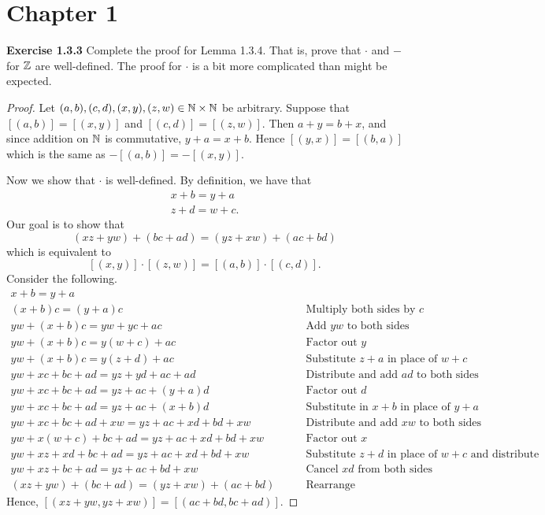 \newpage
\section*{Chapter 1}

\noindent \textbf{Exercise 1.3.3} Complete the proof for Lemma 1.3.4. That is, prove that \(\cdot\) and \(-\) for \(\mathbb{Z}\) are well-defined. The proof for \(\cdot\) is a bit more complicated
than might be expected.
\begin{proof}
    Let \((a,b), (c,d), (x,y), (z,w) \in \mathbb{N} \times \mathbb{N}\) be arbitrary. Suppose that \([(a,b)] = [(x,y)]\) and \([(c,d)] = [(z,w)]\). Then \(a + y = b+x\), and since addition on \(\mathbb{N}\) is commutative, \(y+a = x+b\).
    Hence \([(y,x)] = [(b,a)]\) which is the same as \(-[(a,b)] = -[(x,y)]\).
    \par Now we show that \(\cdot\) is well-defined. By definition, we have that
    \begin{gather*}
        x+b = y+a \\
        z+d = w + c.
    \end{gather*}
    Our goal is to show that \[(xz + yw) + (bc + ad) = (yz + xw) + (ac + bd)\] which is equivalent to \[[(x,y)] \cdot [(z,w)] = [(a,b)] \cdot [(c,d)].\]
    Consider the following.
    \begin{align*}
        x+b = y+a\\
        (x+b)c = (y+a)c &\qquad \text{Multiply both sides by }c\\
        yw + (x+b)c = yw + yc+ac &\qquad \text{Add }yw\text{ to both sides} \\
        yw + (x+b)c = y(w+c) + ac &\qquad \text{Factor out }y\\
        yw + (x+b)c = y(z+d)+ac &\qquad \text{Substitute }z+a\text{ in place of }w+c\\
        yw + xc + bc + ad = yz + yd + ac + ad &\qquad \text{Distribute and add } ad\text{ to both sides}\\
        yw + xc + bc + ad = yz + ac + (y + a)d &\qquad \text{Factor out }d\\
        yw + xc + bc + ad = yz + ac + (x+b)d &\qquad \text{Substitute in }x+b\text{ in place of }y+a\\
        yw + xc + bc + ad + xw = yz + ac + xd + bd + xw &\qquad \text{Distribute and add }xw\text{ to both sides}\\
        yw + x(w+c) + bc + ad = yz + ac + xd + bd + xw &\qquad \text{Factor out }x\\
        yw + xz+xd + bc + ad = yz + ac + xd + bd + xw &\qquad \text{Substitute }z+d \text{ in place of }w+c \text{ and distribute}\\
        yw + xz + bc + ad = yz + ac + bd + xw &\qquad \text{Cancel }xd \text{ from both sides}\\
        (xz + yw) + (bc + ad) = (yz + xw) + (ac + bd) &\qquad \text{Rearrange}
    \end{align*}
    Hence, \([(xz+yw, yz + xw)] = [(ac + bd, bc + ad)]\).
\end{proof}
